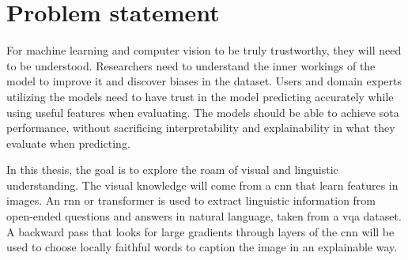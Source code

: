 \label{sec:1_2_problem_statement}

\begin{comment}
In a short and precise way, state what your research is about in this thesis. It can be in the form of a (set of) research questions, goals/aims, or objectives (or a mix) - but it should clearly state what the problems or challenges you are addressing.

Alternatively, one can state a research hypothesis, but if so, it should follow the rules of what a hypothesis is. A hypothesis is a statement that introduces a research question and proposes an expected result. It is an integral part of the scientific method that forms the basis of scientific experiments. Therefore, you need to be careful and thorough when building your hypothesis, following the “rules”.
\end{comment}

\section{Problem statement}

For machine learning and computer vision to be truly trustworthy, they will need to be understood. Researchers need to understand the inner workings of the model to improve it and discover biases in the dataset. Users and domain experts utilizing the models need to have trust in the model predicting accurately while using useful features when evaluating. The models should be able to achieve \gls{sota} performance, without sacrificing interpretability and explainability in what they evaluate when predicting. 

In this thesis, the goal is to explore the roam of visual and linguistic understanding.
The visual knowledge will come from a \gls{cnn} that learn features in images. An \gls{rnn} \cite{rumelhartLearningRepresentationsBackpropagating1986, choLearningPhraseRepresentations2014, sutskeverSequenceSequenceLearning2014, bahdanauNeuralMachineTranslation2016} or transformer is used to extract linguistic information from open-ended questions and answers in natural language, taken from a \gls{vqa} dataset. A backward pass that looks for large gradients through layers of the \gls{cnn} will be used to choose locally faithful words to caption the image in an explainable way. 



